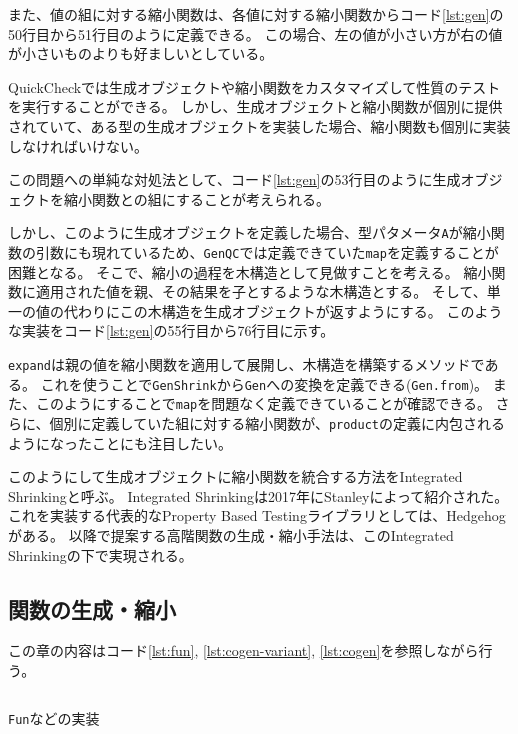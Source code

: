 \documentclass[submit,PRO]{ipsj}
\theoremstyle{definition}
\begin{document}
また、値の組に対する縮小関数は、各値に対する縮小関数からコード\ref{lst:gen}の50行目から51行目のように定義できる。
この場合、左の値が小さい方が右の値が小さいものよりも好ましいとしている。

QuickCheckでは生成オブジェクトや縮小関数をカスタマイズして性質のテストを実行することができる。
しかし、生成オブジェクトと縮小関数が個別に提供されていて、ある型の生成オブジェクトを実装した場合、縮小関数も個別に実装しなければいけない。

この問題への単純な対処法として、コード\ref{lst:gen}の53行目のように生成オブジェクトを縮小関数との組にすることが考えられる。

しかし、このように生成オブジェクトを定義した場合、型パタメータ\texttt{A}が縮小関数の引数にも現れているため、\texttt{GenQC}では定義できていた\texttt{map}を定義することが困難となる。
そこで、縮小の過程を木構造として見做すことを考える。
縮小関数に適用された値を親、その結果を子とするような木構造とする。
そして、単一の値の代わりにこの木構造を生成オブジェクトが返すようにする。
このような実装をコード\ref{lst:gen}の55行目から76行目に示す。

\texttt{expand}は親の値を縮小関数を適用して展開し、木構造を構築するメソッドである。
これを使うことで\texttt{GenShrink}から\texttt{Gen}への変換を定義できる(\texttt{Gen.from})。
また、このようにすることで\texttt{map}を問題なく定義できていることが確認できる。
さらに、個別に定義していた組に対する縮小関数が、\texttt{product}の定義に内包されるようになったことにも注目したい。

このようにして生成オブジェクトに縮小関数を統合する方法をIntegrated Shrinkingと呼ぶ。
Integrated Shrinkingは2017年にStanleyによって紹介された\cite{stanley_gens_2017}。
これを実装する代表的なProperty Based Testingライブラリとしては、Hedgehog\cite{hedgehog_online}がある。
以降で提案する高階関数の生成・縮小手法は、このIntegrated Shrinkingの下で実現される。

\subsection{関数の生成・縮小}

この章の内容はコード\ref{lst:fun}, \ref{lst:cogen-variant}, \ref{lst:cogen}を参照しながら行う。

\begin{listing*}[hbt]
  \inputminted[breaklines,autogobble,linenos,firstline=78,lastline=127]{scala}{../src/main/scala/minicheck.scala}
  \caption{\texttt{Fun}などの実装}
  \label{lst:fun}
\end{listing*}
\end{document}

